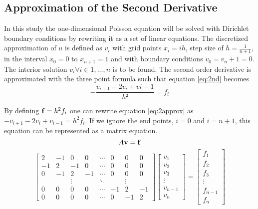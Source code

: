 \documentclass[10pt, a4paper]{amsart}
\begin{document}
\subsection{Approximation of the Second Derivative}
In this study the one-dimensional Poisson equation will be solved with Dirichlet boundary conditions by rewriting it as a set of linear equations. The discretized approximation of $u$ is defined as $v_i$ with grid points $x_i=ih$, step size of $h=\frac{1}{n+1}$, in the interval $x_0=0$ to $x_{n+1}=1$ and with boundary conditions $v_0=v_n+1=0$. The interior solution $v_i \forall i \in {1,...,n}$ is to be found. The second order derivative is approximated with the three point formula such that equation \ref{eq:2nd} becomes
\begin{equation}
-\frac{v_{i+1}-2v_i+v{i-1}}{h²}=f_i \label{eq:2approx}
\end{equation}

By defining $\vb{f}=h^2f_i$ one can rewrite equation
\ref{eq:2approx} as $-v_{i+1}-2v_i+v_{i-1}=h^2f_i$. If we ignore the
end points, $i=0$ and $i=n+1$, this equation can be represented as a
matrix equation.
\begin{equation}
A\vb{v}=\vb{f}
\end{equation}
\begin{equation}
\begin{bmatrix}
2 & -1 & 0 & 0 & \cdots & 0 & 0 & 0 \\
-1 & 2 & -1 & 0 & \cdots & 0 & 0 & 0 \\
0 & -1 & 2 & -1 & \cdots & 0 & 0 & 0 \\ 
& & \vdots &  & \ddots &  & \vdots & \\
0 & 0 & 0 & 0 & \cdots & -1 & 2 & -1 \\
0 & 0 & 0 & 0 & \cdots & 0 & -1 & 2 
\end{bmatrix}
\begin{bmatrix}
v_1 \\
v_2 \\
v_3 \\
\vdots \\
v_{n-1} \\
v_n
\end{bmatrix}=
\begin{bmatrix}
f_1 \\
f_2 \\
f_3 \\
\vdots \\
f_{n-1} \\
f_n
\end{bmatrix}
\end{equation}
\end{document}
